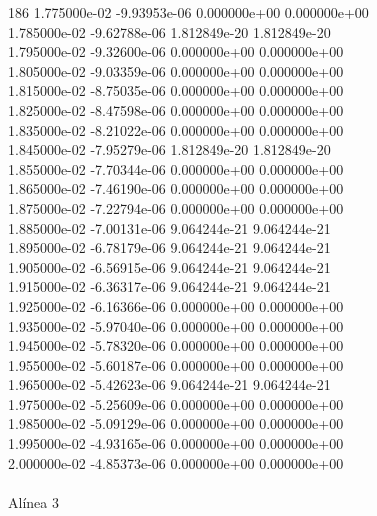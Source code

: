 186	1.775000e-02	-9.93953e-06	0.000000e+00	0.000000e+00	\\ 	1.785000e-02	-9.62788e-06	1.812849e-20	1.812849e-20	\\ 	1.795000e-02	-9.32600e-06	0.000000e+00	0.000000e+00	\\ 	1.805000e-02	-9.03359e-06	0.000000e+00	0.000000e+00	\\ 	1.815000e-02	-8.75035e-06	0.000000e+00	0.000000e+00	\\ 	1.825000e-02	-8.47598e-06	0.000000e+00	0.000000e+00	\\ 	1.835000e-02	-8.21022e-06	0.000000e+00	0.000000e+00	\\ 	1.845000e-02	-7.95279e-06	1.812849e-20	1.812849e-20	\\ 	1.855000e-02	-7.70344e-06	0.000000e+00	0.000000e+00	\\ 	1.865000e-02	-7.46190e-06	0.000000e+00	0.000000e+00	\\ 	1.875000e-02	-7.22794e-06	0.000000e+00	0.000000e+00	\\ 	1.885000e-02	-7.00131e-06	9.064244e-21	9.064244e-21	\\ 	1.895000e-02	-6.78179e-06	9.064244e-21	9.064244e-21	\\ 	1.905000e-02	-6.56915e-06	9.064244e-21	9.064244e-21	\\ 	1.915000e-02	-6.36317e-06	9.064244e-21	9.064244e-21	\\ 	1.925000e-02	-6.16366e-06	0.000000e+00	0.000000e+00	\\ 	1.935000e-02	-5.97040e-06	0.000000e+00	0.000000e+00	\\ 	1.945000e-02	-5.78320e-06	0.000000e+00	0.000000e+00	\\ 	1.955000e-02	-5.60187e-06	0.000000e+00	0.000000e+00	\\ 	1.965000e-02	-5.42623e-06	9.064244e-21	9.064244e-21	\\ 	1.975000e-02	-5.25609e-06	0.000000e+00	0.000000e+00	\\ 	1.985000e-02	-5.09129e-06	0.000000e+00	0.000000e+00	\\ 	1.995000e-02	-4.93165e-06	0.000000e+00	0.000000e+00	\\ 	2.000000e-02	-4.85373e-06	0.000000e+00	0.000000e+00	\\ \hline
\\ \hline
                                   Alínea 3 \\ \hline
